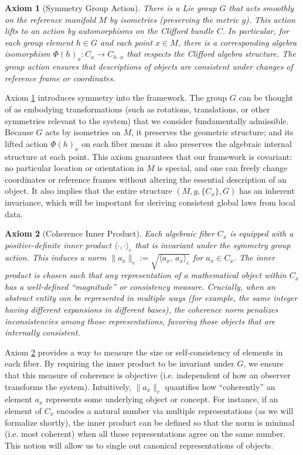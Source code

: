 \documentclass[11pt]{article}
\newtheorem{axiom}{Axiom}
\begin{document}
\begin{axiom}[Symmetry Group Action]\label{ax:symmetry}
There is a Lie group $G$ that acts smoothly on the reference manifold $M$ by isometries (preserving the metric $g$). This action lifts to an action by automorphisms on the Clifford bundle $C$. In particular, for each group element $h \in G$ and each point $x \in M$, there is a corresponding algebra isomorphism $\Phi(h)_x: C_x \to C_{h\cdot x}$ that respects the Clifford algebra structure. The group action ensures that descriptions of objects are consistent under changes of reference frame or coordinates.
\end{axiom}

Axiom \ref{ax:symmetry} introduces symmetry into the framework. The group $G$ can be thought of as embodying transformations (such as rotations, translations, or other symmetries relevant to the system) that we consider fundamentally admissible. Because $G$ acts by isometries on $M$, it preserves the geometric structure; and its lifted action $\Phi(h)_x$ on each fiber means it also preserves the algebraic internal structure at each point. This axiom guarantees that our framework is covariant: no particular location or orientation in $M$ is special, and one can freely change coordinates or reference frames without altering the essential description of an object. It also implies that the entire structure $(M, g, \{C_x\}, G)$ has an inherent invariance, which will be important for deriving consistent global laws from local data.

\begin{axiom}[Coherence Inner Product]\label{ax:coherence}
Each algebraic fiber $C_x$ is equipped with a positive-definite inner product $\langle\cdot,\cdot\rangle_c$ that is invariant under the symmetry group action. This induces a norm $\|a_x\|_c := \sqrt{\langle a_x,\,a_x\rangle_c}$ for $a_x \in C_x$. The inner product is chosen such that any representation of a mathematical object within $C_x$ has a well-defined “magnitude” or consistency measure. Crucially, when an abstract entity can be represented in multiple ways (for example, the same integer having different expansions in different bases), the coherence norm penalizes inconsistencies among those representations, favoring those objects that are internally consistent.
\end{axiom}

Axiom \ref{ax:coherence} provides a way to measure the size or self-consistency of elements in each fiber. By requiring the inner product to be invariant under $G$, we ensure that this measure of coherence is objective (i.e. independent of how an observer transforms the system). Intuitively, $\|a_x\|_c$ quantifies how “coherently” an element $a_x$ represents some underlying object or concept. For instance, if an element of $C_x$ encodes a natural number via multiple representations (as we will formalize shortly), the inner product can be defined so that the norm is minimal (i.e. most coherent) when all those representations agree on the same number. This notion will allow us to single out canonical representations of objects.
\end{document}
